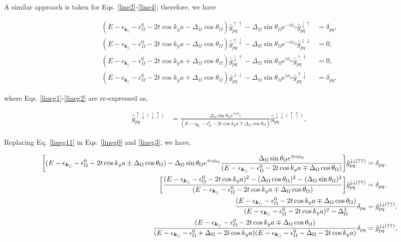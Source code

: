 \documentclass[10pt,prb,showpacs,amssymb,floatfix]{revtex4-1}
\newcommand{\dna}{\downarrow}
\newcommand{\nn}{\nonumber}
\newcommand{\upa}{\uparrow}
\newcommand{\dlt}{\delta}
\newcommand{\Dlt}{\Delta}
\newcommand{\eps}{\epsilon}
\newcommand{\Og}{\Omega}
\begin{document}
A similar approach is taken for Eqs. \eqref{line2}-\eqref{line4}; therefore, we have

\begin{align}
\label{lineg0}
(E-\eps_{\bm{k}_{||}}- \eps_\Og^0   -2t\cos k_ya  -\Dlt_\Og \cos\theta_\Og) \hat{g}^{\upa\upa}_{pq} -\Dlt_\Og \sin\theta_\Og e^{-i\phi_\Og}  \hat{g}^{\dna\upa}_{pq} &=\dlt_{pq}, \\
\label{lineg1}
(E-\eps_{\bm{k}_{||}}- \eps_\Og^0   -2t\cos k_ya  -\Dlt_\Og \cos\theta_\Og) \hat{g}^{\upa\dna}_{pq} -\Dlt_\Og \sin\theta_\Og e^{-i\phi_\Og}  \hat{g}^{\dna\dna}_{pq} &=0, \\
\label{lineg2}
(E-\eps_{\bm{k}_{||}}- \eps_\Og^0   -2t\cos k_ya  +\Dlt_\Og \cos\theta_\Og) \hat{g}^{\dna\upa}_{pq} -\Dlt_\Og \sin\theta_\Og e^{i\phi_\Og}  \hat{g}^{\upa\upa}_{pq} &=0, \\
(E-\eps_{\bm{k}_{||}}- \eps_\Og^0   -2t\cos k_ya  +\Dlt_\Og \cos\theta_\Og) \hat{g}^{\dna\dna}_{pq} -\Dlt_\Og \sin\theta_\Og e^{i\phi_\Og}  \hat{g}^{\upa\dna}_{pq} &=\dlt_{pq}, 
\label{lineg3}
\end{align}

where Eqs. \eqref{lineg1}-\eqref{lineg2} are re-expressed as,

\begin{align}
 \hat{g}^{\upa\dna (\dna\upa)}_{pq}  &= \frac{\Dlt_\Og \sin\theta_\Og e^{\mp i\phi_\Og}}{(E-\eps_{\bm{k}_{||}}- \eps_\Og^0   -2t\cos k_ya  \mp \Dlt_\Og \cos\theta_\Og)}  \hat{g}^{\dna\dna (\upa\upa)}_{pq}, 
\label{lineg11}
\end{align}

Replacing Eq. \eqref{lineg11} in Eqs. \eqref{lineg0} and \eqref{lineg3}, we have,

\begin{align}
\bigg{[}(E-\eps_{\bm{k}_{||}}- \eps_\Og^0   -2t\cos k_ya  \pm \Dlt_\Og \cos\theta_\Og) -\Dlt_\Og \sin\theta_\Og e^{\pm i\phi_\Og}   \frac{\Dlt_\Og \sin\theta_\Og e^{\mp i\phi_\Og}}{(E-\eps_{\bm{k}_{||}}- \eps_\Og^0   -2t\cos k_ya  \mp \Dlt_\Og \cos\theta_\Og)}\bigg{]}  \hat{g}^{\dna\dna (\upa\upa)}_{pq} &=\dlt_{pq}, \nn\\
\bigg{[}\frac{(E-\eps_{\bm{k}_{||}}- \eps_\Og^0   -2t\cos k_ya)^2  -(\Dlt_\Og \cos\theta_\Og)^2 -  (\Dlt_\Og \sin\theta_\Og)^2}{(E-\eps_{\bm{k}_{||}}- \eps_\Og^0   -2t\cos k_ya  \mp \Dlt_\Og \cos\theta_\Og)}\bigg{]}  \hat{g}^{\dna\dna (\upa\upa)}_{pq} &=\dlt_{pq}, \nn\\
 \frac{(E-\eps_{\bm{k}_{||}}- \eps_\Og^0   -2t\cos k_ya  \mp \Dlt_\Og \cos\theta_\Og)}{(E-\eps_{\bm{k}_{||}}- \eps_\Og^0   -2t\cos k_ya)^2  -\Dlt_\Og^2 } \dlt_{pq} &= \hat{g}^{\dna\dna (\upa\upa)}_{pq}, \nn\\
 \frac{(E-\eps_{\bm{k}_{||}}- \eps_\Og^0   -2t\cos k_ya  \mp \Dlt_\Og \cos\theta_\Og)}{(E-\eps_{\bm{k}_{||}}- \eps_\Og^0 +\Dlt_\Og  -2t\cos k_ya) (E-\eps_{\bm{k}_{||}}- \eps_\Og^0 -\Dlt_\Og  -2t\cos k_ya) } \dlt_{pq} &= \hat{g}^{\dna\dna (\upa\upa)}_{pq}, 
\label{gupup0}
\end{align}
\end{document}
